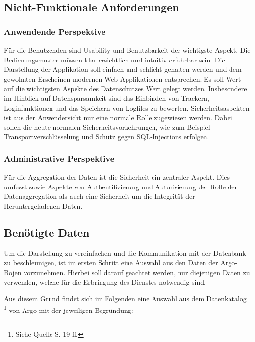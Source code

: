 

\subsection{Nicht-Funktionale Anforderungen}
    
    \subsubsection{Anwendende Perspektive}
        Für die Benutzenden sind Usability und Benutzbarkeit der wichtigste Aspekt. Die Bedienungsmuster müssen klar ersichtlich und intuitiv erfahrbar sein. Die Darstellung der Applikation soll einfach und schlicht gehalten werden und dem gewohnten Erscheinen modernen Web Applikationen entsprechen. 
        Es soll Wert auf die wichtigsten Aspekte des Datenschutzes Wert gelegt werden. Insbesondere im Hinblick auf Datensparsamkeit sind das Einbinden von Trackern, Loginfunktionen und das Speichern von Logfiles zu bewerten.
        Sicherheitsaspekten ist aus der Anwendersicht nur eine normale Rolle zugewiesen werden. Dabei sollen die heute normalen Sicherheitsvorkehrungen, wie zum Beispiel Transportverschlüsselung und Schutz gegen SQL-Injections erfolgen.
        
    \subsubsection{Administrative Perspektive}
        Für die Aggregation der Daten ist die Sicherheit ein zentraler Aspekt. Dies umfasst sowie Aspekte von Authentifizierung und Autorisierung der Rolle der Datenaggregation als auch eine Sicherheit um die Integrität der Heruntergeladenen Daten.
        
    

\subsection{Benötigte Daten}

Um die Darstellung zu vereinfachen und die Kommunikation mit der Datenbank zu beschleunigen, ist im ersten Schritt eine Auswahl aus den Daten der Argo-Bojen vorzunehmen. Hierbei soll darauf geachtet werden, nur diejenigen Daten zu verwenden, welche für die Erbringung des Dienstes notwendig sind.

Aus diesem Grund findet sich im Folgenden eine Auswahl aus dem Datenkatalog \footnote{Siehe Quelle \cite{ArgoUserManual} S. 19 ff.} von Argo mit der jeweiligen Begründung:

